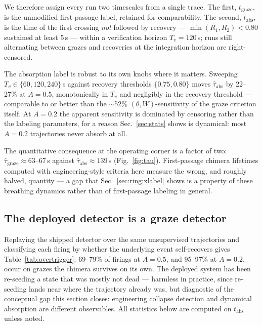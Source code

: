\documentclass[pdflatex,sn-mathphys,Numbered]{sn-jnl}
\begin{document}
We therefore assign every run two timescales from a single trace. The first,
$t_{\mathrm{graze}}$, is the unmodified first-passage label, retained for
comparability. The second, $t_{\mathrm{abs}}$, is the time of the first crossing
\emph{not} followed by recovery --- $\min(R_1, R_2) < 0.80$ sustained at least
5\,s --- within a verification horizon $T_v = 120$\,s; runs still alternating
between grazes and recoveries at the integration horizon are right-censored.

The absorption label is robust to its own knobs where it matters. Sweeping
$T_v \in \{60, 120, 240\}$\,s against recovery thresholds $\{0.75, 0.80\}$ moves
$\hat\tau_{\mathrm{abs}}$ by 22--27\% at $A = 0.5$, monotonically in $T_v$ and
negligibly in the recovery threshold --- comparable to or better than the
$\sim$52\% $(\theta, W)$-sensitivity of the graze criterion itself. At $A = 0.2$
the apparent sensitivity is dominated by censoring rather than the labeling
parameters, for a reason Sec.~\ref{sec:stats} shows is dynamical: most $A = 0.2$
trajectories never absorb at all.

The quantitative consequence at the operating corner is a factor of two:
$\hat\tau_{\mathrm{graze}} \approx 63$--$67$\,s against
$\hat\tau_{\mathrm{abs}} \approx 139$\,s (Fig.~\ref{fig:tau}). First-passage chimera
lifetimes computed with engineering-style criteria here measure the wrong,
and roughly halved, quantity --- a gap that
Sec.~\ref{sec:ring:xlabel} shows is a property of these breathing dynamics
rather than of first-passage labeling in general.

\subsection{The deployed detector is a graze detector}

Replaying the shipped detector over the same unsupervised trajectories and
classifying each firing by whether the underlying event self-recovers gives
Table~\ref{tab:overtrigger}: 69--79\% of firings at $A = 0.5$, and 95--97\% at
$A = 0.2$, occur on grazes the chimera survives on its own. The deployed system has
been re-seeding a state that was mostly not dead --- harmless in practice, since
re-seeding lands near where the trajectory already was, but diagnostic of the
conceptual gap this section closes: engineering collapse detection and dynamical
absorption are different observables. All statistics below are computed on
$t_{\mathrm{abs}}$ unless noted.
\end{document}
